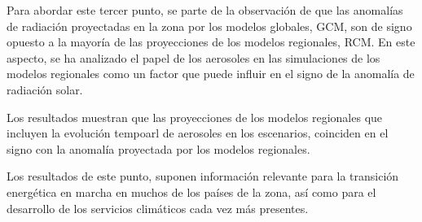 Para abordar este tercer punto, se parte de la observación de que las anomalías de radiación proyectadas en la zona por los modelos globales, GCM, son de signo opuesto a la mayoría de las proyecciones de los modelos regionales, RCM. En este aspecto, se ha analizado el papel de los aerosoles en las simulaciones de los modelos regionales como un factor que puede influir en el signo de la anomalía de radiación solar.

Los resultados muestran que las proyecciones de los modelos regionales que incluyen la evolución tempoarl de aerosoles en los escenarios, coinciden en el signo con la anomalía proyectada por los modelos regionales. 

Los resultados de este punto, suponen información relevante para la transición energética en marcha en muchos de los países de la zona, así como para el desarrollo de los servicios climáticos cada vez más presentes.

